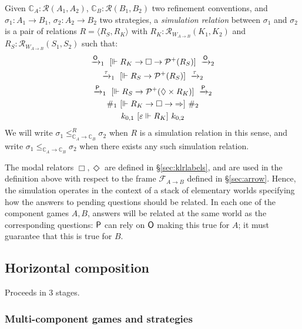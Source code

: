 \begin{definition}
Given
$\mathbb{C}_A : \mathcal{R}(A_1, A_2)$,
$\mathbb{C}_B : \mathcal{R}(B_1, B_2)$
two refinement conventions, and
$\sigma_1 : A_1 \rightarrow B_1$,
$\sigma_2 : A_2 \rightarrow B_2$
two strategies,
a \emph{simulation relation} between $\sigma_1$ and $\sigma_2$
is a pair of relations $R = \langle R_S, R_K \rangle$ with
$R_K : \mathcal{R}_{W_{\!A \rightarrow B}}(K_1, K_2)$ and
$R_S : \mathcal{R}_{W_{\!A \rightarrow B}}(S_1, S_2)$
such that:
\begin{gather*}
  \xrightarrow{ \mathsf{O} }_1
  \ [{\Vdash R_K \rightarrow \Box \rightarrow \mathcal{P}^+(R_S)}]\ 
  \xrightarrow{ \mathsf{O} }_2
  \\
  \xrightarrow{\tau}_1
  \ [{\Vdash R_S \rightarrow \mathcal{P}^+(R_S)}]\ 
  \xrightarrow{\tau}_2
  \\
  \xrightarrow{ \mathsf{P} }_1
  \ [{\Vdash R_S \rightarrow \mathcal{P}^+(\Diamond \times R_K)}]\ 
  \xrightarrow{ \mathsf{P} }_2
  \\
  \#_1
  \ [{\Vdash R_K \rightarrow \Box \rightarrow {\Rightarrow}}]\ 
  \#_2
  \\
  k_{0,1} \ [{\varepsilon \Vdash R_K}]\  k_{0,2}
\end{gather*}
We will write
$\sigma_1 \le_{\mathbb{C}_A \rightarrow \mathbb{C}_B}^R \sigma_2$
when $R$ is a simulation relation in this sense, and write
$\sigma_1 \le_{\mathbb{C}_A \rightarrow \mathbb{C}_B} \sigma_2$
when there exists any such simulation relation.
\end{definition}

The modal relators $\Box, \Diamond$ are defined in \S\ref{sec:klrlabels},
and are used in the definition above
with respect to the frame $\mathcal{F}_{A \rightarrow B}$
defined in \S\ref{sec:arrow}.
Hence, the simulation operates in the context of
a stack of elementary worlds
specifying how the answers to pending questions
should be related.
In each one of the component games $A, B$,
answers will be related at the same world as the corresponding questions:
$ \mathsf{P} $ can rely on $ \mathsf{O} $ making this true for $A$;
it must guarantee that this is true for $B$.

\subsection{Horizontal composition}

Proceeds in 3 stages.

\subsubsection{Multi-component games and strategies}

